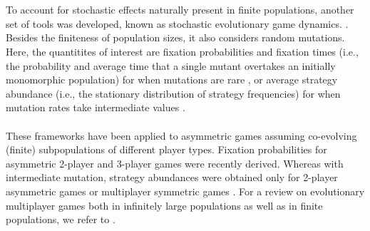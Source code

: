 \documentclass[11pt]{article}
\theoremstyle{plainCl1}
\theoremstyle{plainCl2}
\begin{document}
\\ \\
\noindent To account for stochastic effects naturally present in finite populations, another set of tools was developed, known as stochastic evolutionary game dynamics.  \cite{Nowak:Nature:2004, Traulsen:bookchapter:2009}. Besides the finiteness of population sizes, it also considers random mutations. Here, the quantitites of interest are fixation probabilities and fixation times (i.e., the probability and average time that a single mutant overtakes an initially monomorphic population) for when mutations are rare \cite{bibid}, or average strategy abundance (i.e., the stationary distribution of strategy frequencies) for when mutation rates take intermediate values \cite{antal:JTB:2009a, antal:JTB:2009b}. 
\\ \\
\noindent 
These frameworks have been applied to asymmetric games assuming co-evolving (finite) subpopulations of different player types. Fixation probabilities for asymmetric 2-player \cite{Sekiguchi:DGA:2017} and 3-player games \cite{Sekiguchi:DGA:2022} were recently derived. Whereas with intermediate mutation, strategy abundances were obtained only for 2-player asymmetric games \cite{ohtsuki:JTB:2010, Sekiguchi:PA:2013} or multiplayer symmetric games \cite{gokhale:PNAS:2010, gokhale:JTB:2011, Wu:Games:2013}. For a review on evolutionary multiplayer games both in infinitely large populations as well as in finite populations, we refer to \cite{Gokhale:DGAA:2014}.\\ 

\end{document}
